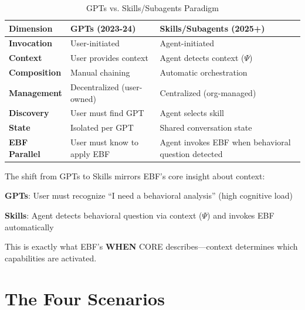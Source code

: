 \begin{table}[htbp]
\centering
\caption{GPTs vs. Skills/Subagents Paradigm}
\label{tab:vvv-gpt-skills}
\renewcommand{\arraystretch}{1.3}
\begin{tabular}{@{}lp{5cm}p{5cm}@{}}
\toprule
\textbf{Dimension} & \textbf{GPTs (2023-24)} & \textbf{Skills/Subagents (2025+)} \\
\midrule
\textbf{Invocation} & User-initiated & Agent-initiated \\
\textbf{Context} & User provides context & Agent detects context ($\Psi$) \\
\textbf{Composition} & Manual chaining & Automatic orchestration \\
\textbf{Management} & Decentralized (user-owned) & Centralized (org-managed) \\
\textbf{Discovery} & User must find GPT & Agent selects skill \\
\textbf{State} & Isolated per GPT & Shared conversation state \\
\midrule
\textbf{EBF Parallel} & User must know to apply EBF & Agent invokes EBF when behavioral question detected \\
\bottomrule
\end{tabular}
\end{table}

\begin{tcolorbox}[colback=yellow!5!white, colframe=yellow!75!black,
    title=Key Insight: Context Detection = WHEN ($\Psi$)]

The shift from GPTs to Skills mirrors EBF's core insight about context:

\textbf{GPTs}: User must recognize ``I need a behavioral analysis'' (high cognitive load)

\textbf{Skills}: Agent detects behavioral question via context ($\Psi$) and invokes EBF automatically

This is exactly what EBF's \textbf{WHEN} CORE describes---context determines which capabilities are activated.

\end{tcolorbox}


\section{The Four Scenarios}
\label{sec:vvv1-scenarios}


